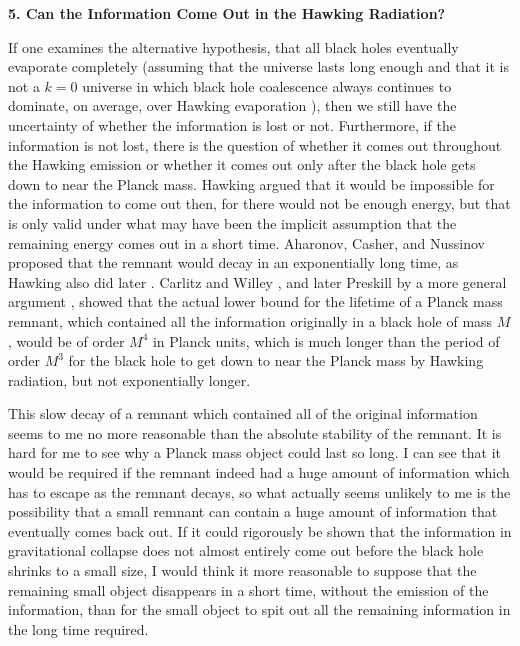 \documentclass[12pt]{article}
\begin{document}
\vspace{5 mm}
{\bf 5.  Can the Information Come Out in the Hawking Radiation?}
\vspace{5 mm}

     If one examines the alternative hypothesis, that all black holes
eventually evaporate completely (assuming that the universe lasts
long enough
and that it is not a $k=0$ universe in which black hole coalescence
always
continues to dominate, on average, over Hawking evaporation
\cite{PM1,PM2}),
then  we still have the uncertainty of whether the information is
lost or not.
Furthermore, if the information is not lost, there is the question of
whether
it comes out throughout the Hawking emission or whether it comes out
only after
the black hole gets down to near the Planck mass.  Hawking argued
\cite{Haw76}
that it would be impossible for the information to come out then, for
there
would not be enough energy, but that is only valid under what may
have been the
implicit assumption that the remaining energy comes out in a short
time.
Aharonov, Casher, and Nussinov \cite{ACN} proposed that the remnant
would
decay
in an exponentially long time, as Hawking also did later
\cite{Haw82}. Carlitz
and Willey \cite{CW87}, and later Preskill by a more general argument
\cite{Pre92}, showed that the actual lower bound for the lifetime of
a Planck
mass remnant, which contained all the information originally in a
black hole of
mass $M$, would be of order $M^4$ in Planck units, which is much
longer than
the period of order $M^3$ for the black hole to get down to near the
Planck
mass by Hawking radiation, but not exponentially longer.

     This slow decay of a remnant which contained all of the original
information seems to me no more reasonable than the absolute
stability of the
remnant.  It is hard for me to see why a Planck mass object could
last so long.  I can see that it would be required if the remnant
indeed had a
huge amount of information which has to escape as the remnant decays,
so what
actually seems unlikely to me is the possibility that a small remnant
can
contain a huge amount of information that eventually comes back out.
If it
could rigorously be shown that the information in gravitational
collapse does
not almost entirely come out before the black hole shrinks to a small
size, I
would think it more reasonable to suppose that the remaining small
object
disappears in a short time, without the emission of the information,
than for
the small object to spit out all the remaining information in the
long time
required.
\end{document}
